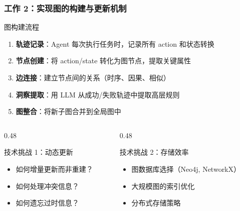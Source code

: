 \documentclass[aspectratio=169,10pt]{beamer}
\begin{document}
\begin{frame}
  \frametitle{工作 2：实现图的构建与更新机制}

  \begin{block}{图构建流程}
    \small
    \begin{enumerate}
      \item \textbf{轨迹记录}：Agent 每次执行任务时，记录所有 action 和状态转换
      \item \textbf{节点创建}：将 action/state 转化为图节点，提取关键属性
      \item \textbf{边连接}：建立节点间的关系（时序、因果、相似）
      \item \textbf{洞察提取}：用 LLM 从成功/失败轨迹中提取高层规则
      \item \textbf{图整合}：将新子图合并到全局图中
    \end{enumerate}
  \end{block}

  \vspace{0.2cm}

  \begin{columns}[T]
    \begin{column}{0.48\textwidth}
      \begin{block}{技术挑战 1：动态更新}
        \footnotesize
        \begin{itemize}
          \item 如何增量更新而非重建？
          \item 如何处理冲突信息？
          \item 如何遗忘过时信息？
        \end{itemize}
      \end{block}
    \end{column}

    \begin{column}{0.48\textwidth}
      \begin{block}{技术挑战 2：存储效率}
        \footnotesize
        \begin{itemize}
          \item 图数据库选择（Neo4j, NetworkX）
          \item 大规模图的索引优化
          \item 分布式存储策略
        \end{itemize}
      \end{block}
    \end{column}
  \end{columns}
\end{frame}
\end{document}
